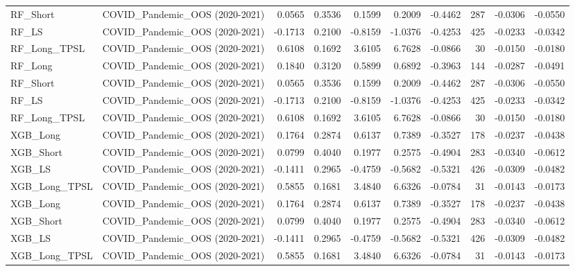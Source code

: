 \begin{tabular}{llrrrrrrrr}
\cline{1-10}
RF\_Short & COVID\_Pandemic\_OOS (2020-2021) & 0.0565 & 0.3536 & 0.1599 & 0.2009 & -0.4462 & 287 & -0.0306 & -0.0550 \\
\cline{1-10}
RF\_LS & COVID\_Pandemic\_OOS (2020-2021) & -0.1713 & 0.2100 & -0.8159 & -1.0376 & -0.4253 & 425 & -0.0233 & -0.0342 \\
\cline{1-10}
RF\_Long\_TPSL & COVID\_Pandemic\_OOS (2020-2021) & 0.6108 & 0.1692 & 3.6105 & 6.7628 & -0.0866 & 30 & -0.0150 & -0.0180 \\
\cline{1-10}
RF\_Long & COVID\_Pandemic\_OOS (2020-2021) & 0.1840 & 0.3120 & 0.5899 & 0.6892 & -0.3963 & 144 & -0.0287 & -0.0491 \\
\cline{1-10}
RF\_Short & COVID\_Pandemic\_OOS (2020-2021) & 0.0565 & 0.3536 & 0.1599 & 0.2009 & -0.4462 & 287 & -0.0306 & -0.0550 \\
\cline{1-10}
RF\_LS & COVID\_Pandemic\_OOS (2020-2021) & -0.1713 & 0.2100 & -0.8159 & -1.0376 & -0.4253 & 425 & -0.0233 & -0.0342 \\
\cline{1-10}
RF\_Long\_TPSL & COVID\_Pandemic\_OOS (2020-2021) & 0.6108 & 0.1692 & 3.6105 & 6.7628 & -0.0866 & 30 & -0.0150 & -0.0180 \\
\cline{1-10}
XGB\_Long & COVID\_Pandemic\_OOS (2020-2021) & 0.1764 & 0.2874 & 0.6137 & 0.7389 & -0.3527 & 178 & -0.0237 & -0.0438 \\
\cline{1-10}
XGB\_Short & COVID\_Pandemic\_OOS (2020-2021) & 0.0799 & 0.4040 & 0.1977 & 0.2575 & -0.4904 & 283 & -0.0340 & -0.0612 \\
\cline{1-10}
XGB\_LS & COVID\_Pandemic\_OOS (2020-2021) & -0.1411 & 0.2965 & -0.4759 & -0.5682 & -0.5321 & 426 & -0.0309 & -0.0482 \\
\cline{1-10}
XGB\_Long\_TPSL & COVID\_Pandemic\_OOS (2020-2021) & 0.5855 & 0.1681 & 3.4840 & 6.6326 & -0.0784 & 31 & -0.0143 & -0.0173 \\
\cline{1-10}
XGB\_Long & COVID\_Pandemic\_OOS (2020-2021) & 0.1764 & 0.2874 & 0.6137 & 0.7389 & -0.3527 & 178 & -0.0237 & -0.0438 \\
\cline{1-10}
XGB\_Short & COVID\_Pandemic\_OOS (2020-2021) & 0.0799 & 0.4040 & 0.1977 & 0.2575 & -0.4904 & 283 & -0.0340 & -0.0612 \\
\cline{1-10}
XGB\_LS & COVID\_Pandemic\_OOS (2020-2021) & -0.1411 & 0.2965 & -0.4759 & -0.5682 & -0.5321 & 426 & -0.0309 & -0.0482 \\
\cline{1-10}
XGB\_Long\_TPSL & COVID\_Pandemic\_OOS (2020-2021) & 0.5855 & 0.1681 & 3.4840 & 6.6326 & -0.0784 & 31 & -0.0143 & -0.0173 \\

\end{tabular}
